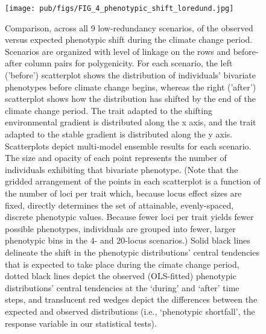 \documentclass[9pt,twocolumn,twoside,lineno]{pnas-new}
\begin{document}
\begin{figure}
\centering
\texttt{[image: pub/figs/FIG\_4\_phenotypic\_shift\_loredund.jpg]}
\caption{Comparison, across all 9 low-redundancy scenarios, of the observed versus expected phenotypic shift during the climate change period. Scenarios are organized with level of linkage on the rows and before-after column pairs for polygenicity. For each scenario, the left ('before') scatterplot shows the distribution of individuals’ bivariate phenotypes before climate change begins, whereas the right ('after') scatterplot shows how the distribution has shifted by the end of the climate change period. The trait adapted to the shifting environmental gradient is distributed along the x axis, and the trait adapted to the stable gradient is distributed along the y axis. Scatterplots depict multi-model ensemble results for each scenario. The size and opacity of each point represents the number of individuals exhibiting that bivariate phenotype. (Note that the gridded arrangement of the points in each scatterplot is a function of the number of loci per trait which, because locus effect sizes are fixed, directly determines the set of attainable, evenly-spaced, discrete phenotypic values. Because fewer loci per trait yields fewer possible phenotypes, individuals are grouped into fewer, larger phenotypic bins in the 4- and 20-locus scenarios.) Solid black lines delineate the shift in the phenotypic distributions’ central tendencies that is expected to take place during the cimate change period, dotted black lines depict the observed (OLS-fitted) phenotypic distributions’ central tendencies at the ‘during’ and ‘after’ time steps, and translucent red wedges depict the differences between the expected and observed distributions (i.e., ‘phenotypic shortfall’, the response variable in our statistical tests).
}
\label{fig:fig_4}
\end{figure}
\end{document}
